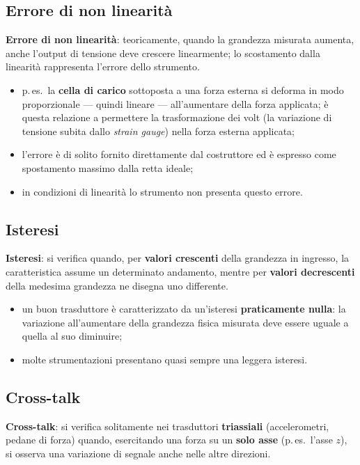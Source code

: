 \subsection{Errore di non linearità}

\textbf{Errore di non linearità}: teoricamente, quando la grandezza misurata aumenta, anche
l'output di tensione deve crescere linearmente; lo scostamento dalla linearità rappresenta l'errore
dello strumento.

\begin{itemize}
  \item p.\,es.\ la \textbf{cella di carico} sottoposta a una forza esterna si deforma in modo
    proporzionale --- quindi lineare --- all'aumentare della forza applicata; è questa relazione a
    permettere la trasformazione dei volt (la variazione di tensione subita dallo \textit{strain
    gauge}) nella forza esterna applicata;
  \item l'errore è di solito fornito direttamente dal costruttore ed è espresso come spostamento
    massimo dalla retta ideale;
  \item in condizioni di linearità lo strumento non presenta questo errore.
\end{itemize}

\subsection{Isteresi}

\textbf{Isteresi}: si verifica quando, per \textbf{valori crescenti} della grandezza in ingresso, la
caratteristica assume un determinato andamento, mentre per \textbf{valori decrescenti} della
medesima grandezza ne disegna uno differente.

\begin{itemize}
  \item un buon trasduttore è caratterizzato da un'isteresi \textbf{praticamente nulla}: la
    variazione all'aumentare della grandezza fisica misurata deve essere uguale a quella al suo
    diminuire;
  \item molte strumentazioni presentano quasi sempre una leggera isteresi.
\end{itemize}

\subsection{Cross-talk}

\textbf{Cross-talk}: si verifica solitamente nei trasduttori \textbf{triassiali} (accelerometri,
pedane di forza) quando, esercitando una forza su un \textbf{solo asse} (p.\,es.\ l'asse $z$), si
osserva una variazione di segnale anche nelle altre direzioni.

